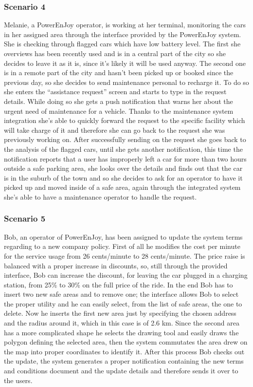 \documentclass[]{article}
\begin{document}
\subsubsection{Scenario 4}\label{scenario-4}

Melanie, a PowerEnJoy operator, is working at her terminal, monitoring
the cars in her assigned area through the interface provided by the
PowerEnJoy system. She is checking through flagged cars which have low
battery level. The first she overviews has been recently used and is in
a central part of the city so she decides to leave it as it is, since
it's likely it will be used anyway. The second one is in a remote part
of the city and hasn't been picked up or booked since the previous day,
so she decides to send maintenance personal to recharge it. To do so she
enters the ``assistance request'' screen and starts to type in the
request details. While doing so she gets a push notification that warns
her about the urgent need of maintenance for a vehicle. Thanks to the
maintenance system integration she's able to quickly forward the request
to the specific facility which will take charge of it and therefore she
can go back to the request she was previously working on. After
successfully sending on the request she goes back to the analysis of the
flagged cars, until she gets another notification, this time the
notification reports that a user has improperly left a car for more than
two hours outside a safe parking area, she looks over the details and
finds out that the car is in the suburb of the town and so she decides
to ask for an operator to have it picked up and moved inside of a safe
area, again through the integrated system she's able to have a
maintenance operator to handle the request.

\subsubsection{Scenario 5}\label{scenario-5}

Bob, an operator of PowerEnJoy, has been assigned to update the system
terms regarding to a new company policy. First of all he modifies the
cost per minute for the service usage from 26 cents/minute to 28
cents/minute. The price raise is balanced with a proper increase in
discounts, so, still through the provided interface, Bob can increase
the discount, for leaving the car plugged in a charging station, from
25\% to 30\% on the full price of the ride. In the end Bob has to insert
two new safe areas and to remove one; the interface allows Bob to select
the proper utility and he can easily select, from the list of safe
areas, the one to delete. Now he inserts the first new area just by
specifying the chosen address and the radius around it, which in this
case is of 2.6 km. Since the second area has a more complicated shape he
selects the drawing tool and easily draws the polygon defining the
selected area, then the system commutates the area drew on the map into
proper coordinates to identify it. After this process Bob checks out the
update, the system generates a proper notification containing the new
terms and conditions document and the update details and therefore sends
it over to the users.
\end{document}
